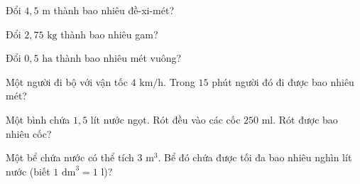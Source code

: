 \begin{ex}
  Đổi $4{,}5\text{ m}$ thành bao nhiêu đề-xi-mét?
\end{ex}

\begin{ex}
  Đổi $2{,}75\text{ kg}$ thành bao nhiêu gam?
\end{ex}

\begin{ex}
  Đổi $0{,}5\text{ ha}$ thành bao nhiêu mét vuông?
\end{ex}

\begin{ex}
  Một người đi bộ với vận tốc $4\text{ km/h}$. Trong $15$ phút người đó đi được bao nhiêu mét?
\end{ex}

\begin{ex}
  Một bình chứa $1{,}5$ lít nước ngọt. Rót đều vào các cốc $250\text{ ml}$. Rót được bao nhiêu cốc?
\end{ex}

\begin{ex}
  Một bể chứa nước có thể tích $3\text{ m}^3$. Bể đó chứa được tối đa bao nhiêu nghìn lít nước (biết $1\text{ dm}^3 = 1\text{ l}$)?
\end{ex}
